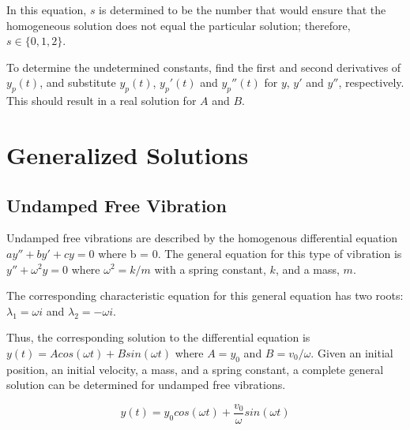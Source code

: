 \documentclass[11pt]{article} %
\begin{document}
\begin{multicols}{2}
In this equation, $s$ is determined to be the number that would ensure that the homogeneous solution does not equal the particular solution; therefore, $s \in \{0, 1, 2\}$.

To determine the undetermined constants, find  the first and second derivatives of $y_p(t)$, and substitute $y_p(t)$, $y_p'(t)$ and $y_p''(t)$ for $y$, $y'$ and $y''$, respectively. This should result in a real solution for $A$ and $B$.

\section {Generalized Solutions}
\subsection {Undamped Free Vibration}
Undamped free vibrations are described by the homogenous differential equation $ay'' + by' + cy = 0$ where b = 0. The general equation for this type of vibration is $y'' + \omega^2y = 0$ where $\omega^2 = k / m$ with a spring constant, $k$, and a mass, $m$.

The corresponding characteristic equation for this general equation has two roots: $\lambda_1 = {\omega}i$ and $\lambda_2 = -{\omega}i$.

Thus, the corresponding solution to the differential equation is $y(t) = Acos({\omega}t) + Bsin({\omega}t)$ where $A = y_0$ and $B = v_0 / \omega$. Given an initial position, an initial velocity, a mass, and a spring constant, a complete general solution can be determined for undamped free vibrations.

\begin{equation}
y(t) = {y_0}cos({\omega}t) +  \frac{v_0}{\omega}sin({\omega}t)
\end{equation}


\end{multicols}
\end{document}
